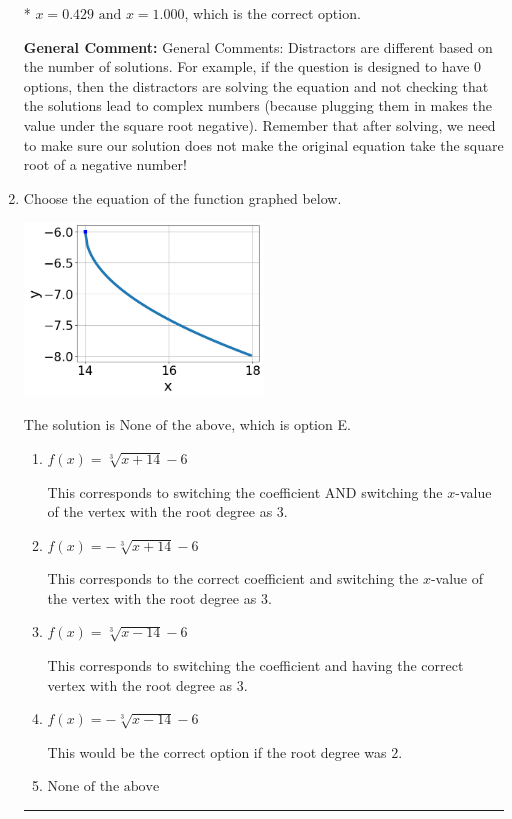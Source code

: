 \documentclass{extbook}[14pt]
\newcommand{\litem}[1]{\item #1

\rule{\textwidth}{0.4pt}}
\begin{document}
\begin{enumerate}
{\begin{enumerate}[label=\Alph*.]
* $x = 0.429 \text{ and } x = 1.000$, which is the correct option.
\end{enumerate}

\textbf{General Comment:} General Comments: Distractors are different based on the number of solutions. For example, if the question is designed to have 0 options, then the distractors are solving the equation and not checking that the solutions lead to complex numbers (because plugging them in makes the value under the square root negative). Remember that after solving, we need to make sure our solution does not make the original equation take the square root of a negative number!
}
\litem{
Choose the equation of the function graphed below.

\begin{center}
    \includegraphics[width=0.5\textwidth]{../Figures/radicalGraphToEquationA.png}
\end{center}


The solution is \( \text{None of the above} \), which is option E.\begin{enumerate}[label=\Alph*.]
\item \( f(x) = \sqrt[3]{x + 14} - 6 \)

This corresponds to switching the coefficient AND switching the $x$-value of the vertex with the root degree as $3$.
\item \( f(x) = - \sqrt[3]{x + 14} - 6 \)

This corresponds to the correct coefficient and switching the $x$-value of the vertex with the root degree as $3$.
\item \( f(x) = \sqrt[3]{x - 14} - 6 \)

This corresponds to switching the coefficient and having the correct vertex with the root degree as $3$.
\item \( f(x) = - \sqrt[3]{x - 14} - 6 \)

This would be the correct option if the root degree was $2$.
\item \( \text{None of the above} \)


\end{enumerate}}
\end{enumerate}
\end{document}
